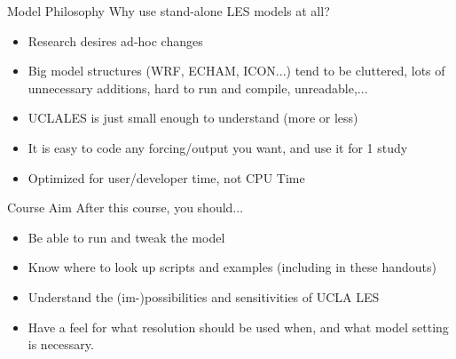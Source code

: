 \documentclass[handout]{beamer}
\begin{document}
\begin{frame}{Model Philosophy}
Why use stand-alone LES models at all?
\begin{itemize}
 \item Research desires ad-hoc changes
 \item Big model structures (WRF, ECHAM, ICON...) tend to be cluttered, lots of unnecessary additions, hard to run and compile, unreadable,...
 \item UCLALES is just small enough to understand (more or less)
 \item It is easy to code any forcing/output you want, and use it for 1 study
 \item Optimized for user/developer time, not CPU Time
\end{itemize}
 \end{frame}
\begin{frame}{Course Aim}
 After this course, you should...
\begin{itemize}
 \item Be able to run and tweak the model
 \item Know where to look up scripts and examples (including in these handouts)
 \item Understand the (im-)possibilities and sensitivities of UCLA LES
 \item Have a feel for what resolution should be used when, and what model setting is necessary.
\end{itemize}

\end{frame}
\end{document}
